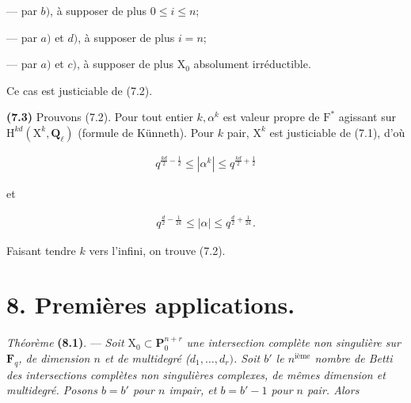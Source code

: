\documentclass[10pt,leqno]{article}
\begin{document}
\noindent — par \(b)\), à supposer de plus \(0\leq i\leq n\);\par

\noindent — par \(a)\) et \(d)\), à supposer de plus \(i=n\);\par

\noindent — par \(a)\) et \(c)\), à supposer de plus \(\mathrm{X}_{0}\) absolument irréductible.\par

\noindent Ce cas est justiciable de (7.2).\par

\noindent \textbf{(7.3)} Prouvons (7.2). Pour tout entier \(k, \alpha ^{k}\) est valeur propre de \(\mathrm{F}^{*}\) agissant sur \(\mathrm{H}^{kd}(\mathrm{X}^{k},\mathbf{Q}_{\ell })\) (formule de Künneth). Pour \(k\) pair, \(\mathrm{X}^{k}\) est justiciable de (7.1), d’où\par

\begin{equation*}\begin{gathered}q^{\frac{kd}{2}- \frac{1}{2}} \leq  |\alpha ^{k}| \leq  q^{\frac{kd}{2}+\frac{1}{2}}\end{gathered}\end{equation*}

\noindent et\par

\begin{equation*}\begin{gathered}q^{\frac{d}{2}- \frac{1}{2k}} \leq  |\alpha | \leq  q^{\frac{d}{2}+\frac{1}{2k}}.\end{gathered}\end{equation*}

\noindent Faisant tendre \(k\) vers l’infini, on trouve (7.2).\par

\section*{8. Premières applications.}

\noindent \emph{Théorème} \textbf{(8.1)}. — {\itshape Soit \(\mathrm{X}_{0}\subset \mathbf{P}_{0}^{n+r}\) une intersection complète non singulière sur \(\mathbf{F}_{q}\), de dimension \(n\) et de multidegré (\(d_{1},\ldots ,d_{r})\). Soit \(b'\) le \(n^{\mathrm{ième}}\) nombre de Betti des intersections complètes non singulières complexes, de mêmes dimension et multidegré. Posons \(b=b'\) pour \(n\) impair, et \(b=b'- 1\) pour \(n\) pair. Alors}\par
\end{document}
